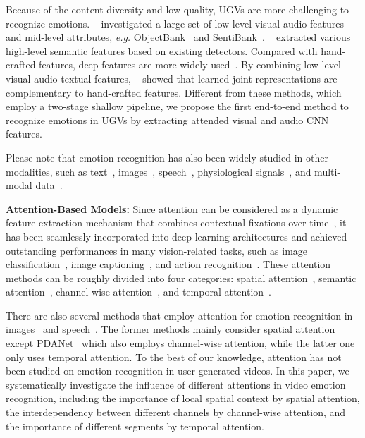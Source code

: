 \documentclass[letterpaper]{article} \usepackage{aaai20}  \usepackage{times}  \usepackage{helvet} \usepackage{courier}  \usepackage[hyphens]{url}  \usepackage{graphicx} \urlstyle{rm} \def\UrlFont{\rm}  \usepackage{graphicx}
\begin{document}
Because of the content diversity and low quality, UGVs are more challenging to recognize emotions. \citeauthor{jiang2014predicting}~ investigated a large set of low-level visual-audio features and mid-level attributes, \textit{e.g.} ObjectBank~\cite{li2010object} and SentiBank~\cite{borth2013sentibank}. \citeauthor{chen2016emotion}~ extracted various high-level semantic features based on existing detectors. Compared with hand-crafted features, deep features are more widely used~\cite{xu2018heterogeneous,zhang2018recognition}. By combining low-level visual-audio-textual features, \citeauthor{pang2015deep}~ showed that learned joint representations are complementary to hand-crafted features. Different from these methods, which employ a two-stage shallow pipeline, we propose the first end-to-end method to recognize emotions in UGVs by extracting attended visual and audio CNN features.

Please note that emotion recognition has also been widely studied in other modalities, such as text~\cite{zhang2018deep}, images~\cite{zhao2017continuous,yang2018retrieving,zhao2018affective,yang2018weakly,zhao2018emotiongan,zhao2019cycleemotiongan,zhao2019pdanet,yao2019attention,zhan2019zero}, speech~\cite{el2011survey}, physiological signals~\cite{alarcao2017emotions,zhao2019personalized}, and multi-modal data~\cite{soleymani2017survey,zhao2019affective}.



\noindent\textbf{Attention-Based Models:} Since attention can be considered as a dynamic feature extraction mechanism that combines contextual fixations over time~\cite{mnih2014recurrent,chen2017sca}, it has been seamlessly incorporated into deep learning architectures and  achieved outstanding performances in many vision-related tasks, such as image classification~\cite{woo2018cbam}, image captioning~\cite{you2016image,chen2017sca,chen2018show}, and action recognition~\cite{song2017end}. These attention methods can be roughly divided into four categories: spatial attention~\cite{song2017end,woo2018cbam}, semantic attention~\cite{you2016image}, channel-wise attention~\cite{chen2017sca,woo2018cbam}, and temporal attention~\cite{song2017end}.

There are also several methods that employ attention for emotion recognition in images~\cite{you2017visual,yang2018weakly,zhao2019pdanet} and speech~\cite{mirsamadi2017automatic}. The former methods mainly consider spatial attention except PDANet~\cite{zhao2019pdanet} which also employs channel-wise attention, while the latter one only uses temporal attention. To the best of our knowledge, attention has not been studied on emotion recognition in user-generated videos. In this paper, we systematically investigate the influence of different attentions in video emotion recognition, including the importance of local spatial context by spatial attention, the interdependency between different channels by channel-wise attention, and the importance of different segments by temporal attention.
\end{document}
